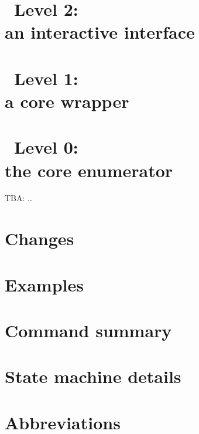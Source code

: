 \documentclass[12pt,a4paper,twoside]{cramrpt}
\begin{document}

\chapter{\ace\ Level 2: \\ an interactive interface}



\chapter{\ace\ Level 1: \\ a core wrapper}



\chapter{\ace\ Level 0: \\ the core enumerator}
%

TBA: \dots

% 


\clearpage
\appendix

\chapter{Changes}\label{app:ch}


\chapter{Examples}\label{app:ex}


\chapter{Command summary}\label{app:cmd}


\chapter{State machine details}\label{app:smd}


\chapter{Abbreviations}\label{app:abb}

\end{document}
